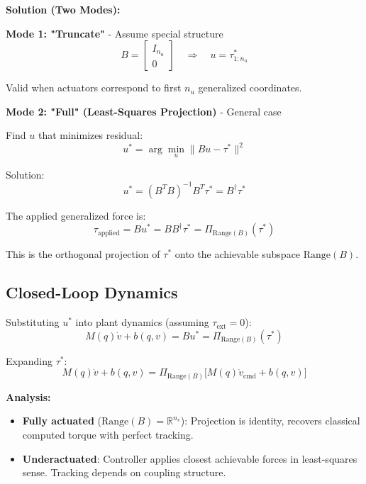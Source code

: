 \textbf{Solution (Two Modes):}

\textbf{Mode 1: "Truncate"} - Assume special structure
\begin{equation}
B = \begin{bmatrix} I_{n_u} \\ 0 \end{bmatrix}
\quad \Rightarrow \quad
u = \tau^*_{1:n_u}
\end{equation}

Valid when actuators correspond to first $n_u$ generalized coordinates.

\textbf{Mode 2: "Full" (Least-Squares Projection)} - General case

Find $u$ that minimizes residual:
\begin{equation}
u^* = \arg\min_u \|Bu - \tau^*\|^2
\tag{LS Problem}
\end{equation}

Solution:
\begin{equation}
u^* = (B^T B)^{-1} B^T \tau^* = B^{\dagger} \tau^*
\tag{Pseudoinverse}
\end{equation}

The applied generalized force is:
\begin{equation}
\tau_{\text{applied}} = Bu^* = BB^{\dagger}\tau^* = \Pi_{\text{Range}(B)}(\tau^*)
\end{equation}

This is the orthogonal projection of $\tau^*$ onto the achievable subspace $\text{Range}(B)$.

\subsection*{Closed-Loop Dynamics}

Substituting $u^*$ into plant dynamics (assuming $\tau_{\text{ext}}=0$):
\begin{equation}
M(q)\dot{v} + b(q,v) = Bu^* = \Pi_{\text{Range}(B)}(\tau^*)
\end{equation}

Expanding $\tau^*$:
\begin{equation}
M(q)\dot{v} + b(q,v) = \Pi_{\text{Range}(B)}\big[M(q)\dot{v}_{\text{cmd}} + b(q,v)\big]
\tag{Closed-Loop}
\end{equation}

\textbf{Analysis:}
\begin{itemize}
\item \textbf{Fully actuated} ($\text{Range}(B) = \mathbb{R}^{n_v}$): Projection is identity, recovers classical computed torque with perfect tracking.
\item \textbf{Underactuated}: Controller applies closest achievable forces in least-squares sense. Tracking depends on coupling structure.
\end{itemize}

